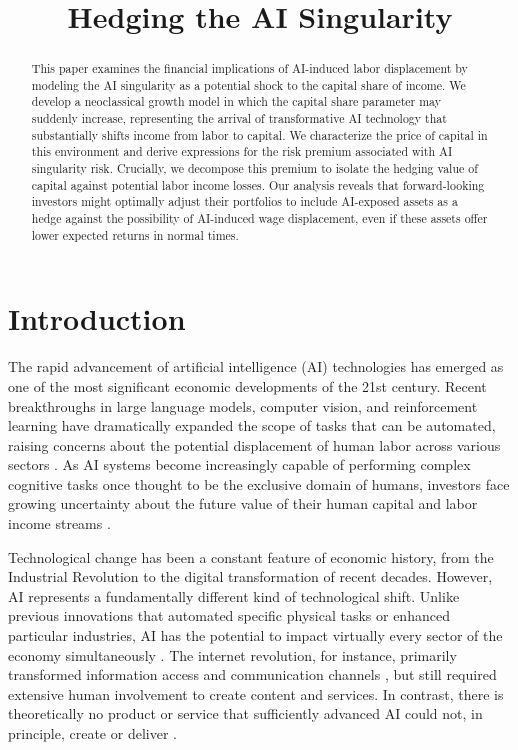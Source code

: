 \documentclass{article}
\theoremstyle{plain}    %
\theoremstyle{definition}  %
\begin{document}
\title{Hedging the AI Singularity}
\author{}
\date{}

\maketitle

\begin{abstract}
This paper examines the financial implications of AI-induced labor displacement by modeling the AI singularity as a potential shock to the capital share of income. We develop a neoclassical growth model in which the capital share parameter may suddenly increase, representing the arrival of transformative AI technology that substantially shifts income from labor to capital. We characterize the price of capital in this environment and derive expressions for the risk premium associated with AI singularity risk. Crucially, we decompose this premium to isolate the hedging value of capital against potential labor income losses. Our analysis reveals that forward-looking investors might optimally adjust their portfolios to include AI-exposed assets as a hedge against the possibility of AI-induced wage displacement, even if these assets offer lower expected returns in normal times.
\end{abstract}

\section{Introduction}

The rapid advancement of artificial intelligence (AI) technologies has emerged as one of the most significant economic developments of the 21st century. Recent breakthroughs in large language models, computer vision, and reinforcement learning have dramatically expanded the scope of tasks that can be automated, raising concerns about the potential displacement of human labor across various sectors \citep{acemoglu2020}. As AI systems become increasingly capable of performing complex cognitive tasks once thought to be the exclusive domain of humans, investors face growing uncertainty about the future value of their human capital and labor income streams \citep{garleanu2012, kogan2020}.

Technological change has been a constant feature of economic history, from the Industrial Revolution to the digital transformation of recent decades. However, AI represents a fundamentally different kind of technological shift. Unlike previous innovations that automated specific physical tasks or enhanced particular industries, AI has the potential to impact virtually every sector of the economy simultaneously \citep{babina2024}. The internet revolution, for instance, primarily transformed information access and communication channels \citep{ofek2003, hong2006}, but still required extensive human involvement to create content and services. In contrast, there is theoretically no product or service that sufficiently advanced AI could not, in principle, create or deliver \citep{chen2024}.
\end{document}
